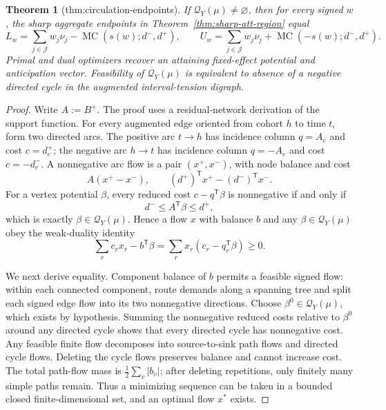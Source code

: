 \documentclass{article}
\newtheorem{theorem}{Theorem}
\begin{document}
\begin{theorem}[thm:circulation-endpoints]\label{thm:circulation-endpoints}
If \(\mathcal Q_Y(\mu)\ne\varnothing\), then for every signed \(w\), the sharp aggregate endpoints in Theorem~\ref{thm:sharp-att-region} equal
\[
 L_w=\sum_{j\in\mathcal J}w_j\nu_j-\operatorname{MC}(s(w);d^-,d^+),
 \qquad
 U_w=\sum_{j\in\mathcal J}w_j\nu_j+\operatorname{MC}(-s(w);d^-,d^+).
\]
Primal and dual optimizers recover an attaining fixed-effect potential and anticipation vector. Feasibility of \(\mathcal Q_Y(\mu)\) is equivalent to absence of a negative directed cycle in the augmented interval-tension digraph.
\end{theorem}
\begin{proof}
Write \(A:=B^+\).  The proof uses a residual-network derivation of the support function.  For every augmented edge oriented from cohort \(h\) to time \(t\), form two directed arcs.  The positive arc \(t\to h\) has incidence column \(q=A_e\) and cost \(c=d^+_e\); the negative arc \(h\to t\) has incidence column \(q=-A_e\) and cost \(c=-d^-_e\).  A nonnegative arc flow is a pair \((x^+,x^-)\), with node balance and cost
\[
 A(x^+-x^-),
 \qquad
 (d^+)^{\mathsf T}x^+-(d^-)^{\mathsf T}x^-.
\tag{19}
\]
For a vertex potential \(\beta\), every reduced cost \(c-q^{\mathsf T}\beta\) is nonnegative if and only if
\[
 d^-\le A^{\mathsf T}\beta\le d^+,
\tag{20}
\]
which is exactly \(\beta\in\mathcal Q_Y(\mu)\).  Hence a flow \(x\) with balance \(b\) and any \(\beta\in\mathcal Q_Y(\mu)\) obey the weak-duality identity
\[
 \sum_r c_rx_r-b^{\mathsf T}\beta
 =\sum_r x_r(c_r-q_r^{\mathsf T}\beta)\ge0.
\tag{21}
\]

We next derive equality.  Component balance of \(b\) permits a feasible signed flow: within each connected component, route demands along a spanning tree and split each signed edge flow into its two nonnegative directions.  Choose \(\beta^0\in\mathcal Q_Y(\mu)\), which exists by hypothesis.  Summing the nonnegative reduced costs relative to \(\beta^0\) around any directed cycle shows that every directed cycle has nonnegative cost.  Any feasible finite flow decomposes into source-to-sink path flows and directed cycle flows.  Deleting the cycle flows preserves balance and cannot increase cost.  The total path-flow mass is \(\frac12\sum_v|b_v|\); after deleting repetitions, only finitely many simple paths remain.  Thus a minimizing sequence can be taken in a bounded closed finite-dimensional set, and an optimal flow \(x^*\) exists.


\end{proof}
\end{document}
